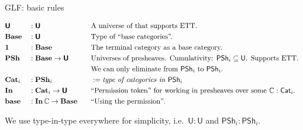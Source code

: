 \documentclass[dvipsnames,aspectratio=169]{beamer}
\newcommand{\mbb}[1]{\mathbb{#1}}
\newcommand{\mbf}[1]{\mathbf{#1}}
\newcommand{\bs}[1]{\boldsymbol{#1}}
\newcommand{\U}{\mathsf{U}}
\newcommand{\PSh}{\mathsf{PSh}}
\newcommand{\Cat}{\mathsf{Cat}}
\newcommand{\bBase}{\mathbf{Base}}
\newcommand{\bIn}{\mathbf{In}}
\newcommand{\bPSh}{\mathbf{PSh}}
\newcommand{\bCat}{\mathbf{Cat}}
\newcommand{\bbase}{\mathbf{base}}
\newcommand{\bU}{\bs{\U}}
\newcommand{\mbbC}{\mbb{C}}
\begin{document}
\begin{frame}{GLF: basic rules}

\begin{block}{}
\vspace{-1em}
\begin{alignat*}{3}
  & \bU     && : \bU           \hspace{6em}&& \text{A universe of that supports ETT.}\\
  & \bBase  && : \bU                 && \text{Type of ``base categories''.} \\
  & \mbf{1} && : \bBase                && \text{The terminal category as a base category.} \\
  & \bPSh   && : \bBase \to \bU      && \text{Universes of presheaves. Cumulativity: $\PSh_i \subseteq \U$. Supports ETT.}\\
  &        &&                          && \text{We can only eliminate from $\PSh_i$ to $\PSh_i$.} \\
  & \bCat_i && : \bPSh_i               && := \text{\emph{type of categories in $\PSh_i$}} \\
  & \bIn    &&: \bCat_i \to \bU      && \text{``Permission token'' for working in presheaves over some $\mbbC : \Cat_i$.} \\
  & \bbase  &&: \bIn\,\mbbC \to \bBase     && \text{``Using the permission''}.
\end{alignat*}
\end{block}
\vspace{1em}

{\small We use type-in-type everywhere for simplicity, i.e.\ $\U : \U$ and $\PSh_i : \PSh_i$.}

\end{frame}
\end{document}
